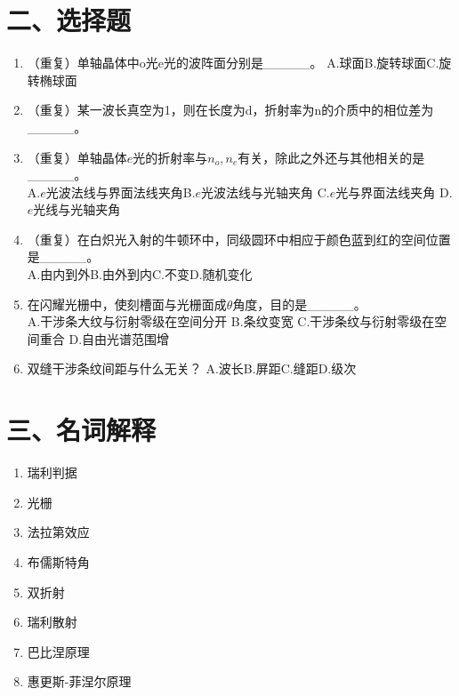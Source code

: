 \documentclass[12pt, a4paper]{article}
\theoremstyle{solution}
\begin{document}
\section*{二、选择题}
\begin{enumerate}
    \item （重复）单轴晶体中o光e光的波阵面分别是\_\_\_\_\_。
    A.球面\quad B.旋转球面\quad C.旋转椭球面
    \item （重复）某一波长真空为1，则在长度为d，折射率为n的介质中的相位差为\_\_\_\_\_。
    \item （重复）单轴晶体$e$光的折射率与$n_o,n_e$有关，除此之外还与其他相关的是\_\_\_\_\_。\\
    A.$e$光波法线与界面法线夹角\quad B.$e$光波法线与光轴夹角 \quad C.$e$光与界面法线夹角 \quad D.$e$光线与光轴夹角
    \item （重复）在白炽光入射的牛顿环中，同级圆环中相应于颜色蓝到红的空间位置是\_\_\_\_\_。 \\
    A.由内到外\quad B.由外到内\quad C.不变\quad D.随机变化
    \item 在闪耀光栅中，使刻槽面与光栅面成$\theta $角度，目的是\_\_\_\_\_。\\
    A.干涉条大纹与衍射零级在空间分开 \quad B.条纹变宽 \quad C.干涉条纹与衍射零级在空间重合 \quad D.自由光谱范围增
    \item 双缝干涉条纹间距与什么无关？
    A.波长\quad B.屏距\quad C.缝距\quad D.级次    
\end{enumerate}
\section*{三、名词解释}
\begin{enumerate}
    \item 瑞利判据
    \item 光栅
    \item 法拉第效应
    \item 布儒斯特角
    \item 双折射
    \item 瑞利散射
    \item 巴比涅原理
    \item 惠更斯-菲涅尔原理 
\end{enumerate}
\end{document}
